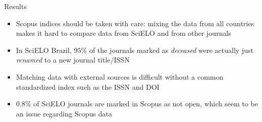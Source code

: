 \documentclass[utf8]{beamer}
\begin{document}
\begin{frame}{Results}
  \begin{itemize}
    \item Scopus indices should be taken with care:
          mixing the data from all countries
          makes it hard to compare data from SciELO and
          from other journals
    \item In SciELO Brazil, $95\%$ of the journals
          marked as \emph{deceased}
          were actually just \emph{renamed}
          to a new journal title/ISSN
    \item Matching data with external sources is difficult
          without a common standardized index
          such as the ISSN and DOI
    \item $0.8\%$ of SciELO journals are marked in Scopus as not open,
          which seem to be an issue regarding Scopus data
  \end{itemize}
\end{frame}
\end{document}
